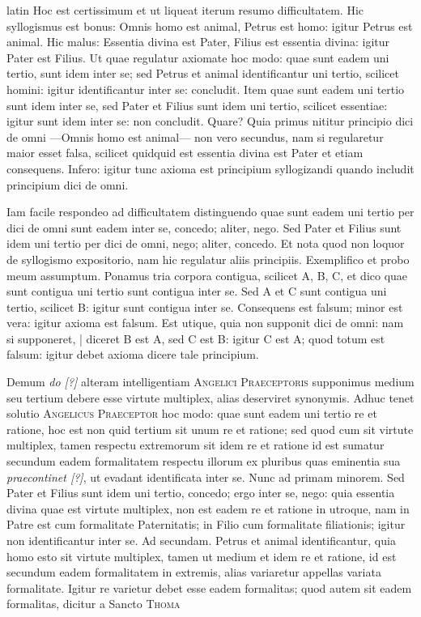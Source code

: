 \begin{otherlanguage*}{latin}
\pstart
Hoc est certissimum et ut liqueat iterum resumo difficultatem. Hic syllogismus est bonus:
Omnis homo est animal, Petrus est homo:
igitur Petrus est animal. Hic malus:
Essentia divina est Pater, Filius est essentia divina:
igitur Pater est Filius. Ut quae regulatur axiomate hoc modo:
quae sunt eadem uni tertio, sunt idem inter se; sed Petrus et animal identificantur uni tertio, scilicet homini:
igitur identificantur inter se:
concludit. Item quae sunt eadem uni tertio sunt idem inter se, sed Pater et Filius sunt idem uni tertio, scilicet essentiae:
igitur sunt idem inter se:
non concludit. Quare? Quia primus nititur principio dici de omni —Omnis homo est animal— non vero secundus, nam si regularetur maior esset falsa, scilicet quidquid est essentia divina est Pater et etiam consequens. Infero:
igitur tunc axioma est principium syllogizandi quando includit principium dici de omni. 
\pend

\pstart
Iam facile respondeo ad difficultatem distinguendo quae sunt eadem uni tertio per dici de omni sunt eadem inter se, concedo; aliter, nego. Sed Pater et Filius sunt idem uni tertio per dici de omni, nego; aliter, concedo. Et nota quod non loquor de syllogismo expositorio, nam hic regulatur aliis principiis. Exemplifico et probo meum assumptum. Ponamus tria corpora contigua, scilicet A, B, C, et dico quae sunt contigua uni tertio sunt contigua inter se. Sed A et C sunt contigua uni tertio, scilicet B:
igitur sunt contigua inter se. Consequens est falsum; minor est vera:
igitur axioma est falsum. Est utique, quia non supponit dici de omni:
nam si supponeret, \textnormal{|} diceret B est A, sed C est B:
igitur C est A; quod totum est falsum:
igitur debet axioma dicere tale principium. 
\pend

\pstart
Demum \emph{do [?]} alteram intelligentiam \textsc{Angelici Praeceptoris} supponimus medium seu tertium debere esse virtute multiplex, alias deserviret synonymis. Adhuc tenet solutio \textsc{Angelicus Praeceptor} hoc modo:
quae sunt eadem uni tertio re et ratione, hoc est non quid tertium sit unum re et ratione; sed quod cum sit virtute multiplex, tamen respectu extremorum sit idem re et ratione id est sumatur secundum eadem formalitatem respectu illorum ex pluribus quas eminentia sua \emph{praecontinet [?]}, ut evadant identificata inter se. Nunc ad primam minorem. Sed Pater et Filius sunt idem uni tertio, concedo; ergo inter se, nego:
quia essentia divina quae est virtute multiplex, non est eadem re et ratione in utroque, nam in Patre est cum formalitate Paternitatis; in Filio cum formalitate filiationis; igitur non identificantur inter se. Ad secundam. Petrus et animal identificantur, quia homo esto sit virtute multiplex, tamen ut medium et idem re et ratione, id est secundum eadem formalitatem in extremis, alias variaretur appellas variata formalitate. Igitur re varietur debet esse eadem formalitas; quod autem sit eadem formalitas, dicitur a Sancto \textsc{Thoma} 
\pend


\end{otherlanguage*}
